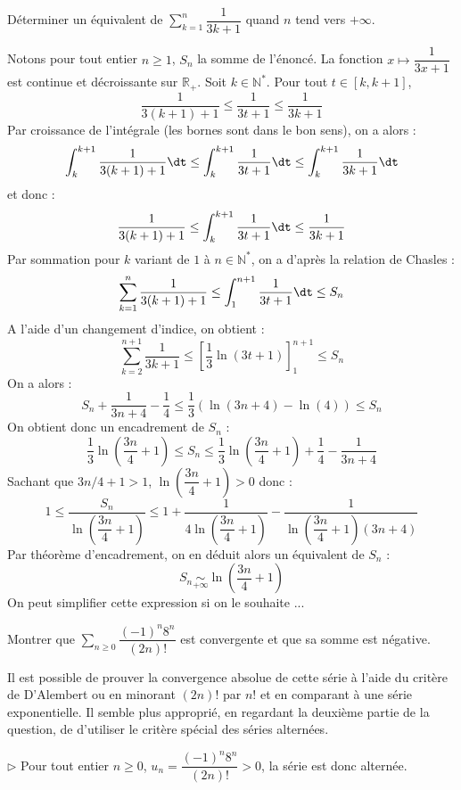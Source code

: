 \documentclass[a4paper,10pt]{report}
\newcommand{\Sum}[2]{\ensuremath{\textstyle{\sum\limits_{#1}^{#2}}}}
\begin{document}
\begin{Exa} Déterminer un équivalent de $\Sum{k=1}n \dfrac{1}{3k+1}$ quand $n$ tend vers $+ \infty$.
\end{Exa}

\corr Notons pour tout entier $n \geq 1$, $S_n$ la somme de l'énoncé. La fonction $x \mapsto \dfrac{1}{3x+1}$ est continue et décroissante sur $\mathbb{R}_+$. Soit $k \in \mathbb{N}^*$. Pour tout $t \in [k,k+1]$,
$$ \dfrac{1}{3(k+1)+1} \leq \dfrac{1}{3t+1} \leq \dfrac{1}{3k+1}$$
Par croissance de l'intégrale (les bornes sont dans le bon sens), on a alors :
$$ \int_{k}^{k+1} \dfrac{1}{3(k+1)+1} \dt \leq  \int_{k}^{k+1} \dfrac{1}{3t+1} \dt \leq  \int_{k}^{k+1} \dfrac{1}{3k+1} \dt$$
et donc :
$$  \dfrac{1}{3(k+1)+1}  \leq  \int_{k}^{k+1} \dfrac{1}{3t+1} \dt  \leq  \dfrac{1}{3k+1} $$
Par sommation pour $k$ variant de $1$ à $n \in \mathbb{N}^*$, on a d'après la relation de Chasles :
$$ \sum_{k=1}^n \dfrac{1}{3(k+1)+1}  \leq  \int_{1}^{n+1} \dfrac{1}{3t+1} \dt  \leq S_n $$
A l'aide d'un changement d'indice, on obtient :
$$ \sum_{k=2}^{n+1} \dfrac{1}{3k+1}  \leq  \left[ \dfrac{1}{3} \ln(3t+1) \right]_1^{n+1}  \leq S_n $$
On a alors :
$$ S_n + \dfrac{1}{3n+4} - \dfrac{1}{4} \leq \dfrac{1}{3} ( \ln(3n+4)- \ln(4)) \leq S_n $$
On obtient donc un encadrement de $S_n$ :
$$ \dfrac{1}{3} \ln \left( \dfrac{3n}{4} + 1 \right) \leq S_n \leq \dfrac{1}{3} \ln \left( \dfrac{3n}{4} + 1 \right) + \dfrac{1}{4} - \dfrac{1}{3n+4}$$
Sachant que $3n/4+1>1$, $\ln \left( \dfrac{3n}{4} + 1 \right)>0$ donc :
$$ 1 \leq \dfrac{S_n}{\ln \left( \dfrac{3n}{4} + 1 \right)} \leq 1 + \dfrac{1}{4\ln \left( \dfrac{3n}{4} + 1 \right)} - \dfrac{1}{\ln \left( \dfrac{3n}{4} + 1 \right)(3n+4)}$$
Par théorème d'encadrement, on en déduit alors un équivalent de $S_n$ :
$$ S_n \underset{+ \infty}{\sim} \ln \left( \dfrac{3n}{4} + 1 \right)$$
On peut simplifier cette expression si on le souhaite ...

\begin{Exa} Montrer que $\Sum{n \geq 0}{} {\dfrac{( - 1)^n 8^n}{(2n)!}}$ est convergente et que sa somme est négative. \end{Exa}

\corr Il est possible de prouver la convergence absolue de cette série à l'aide du critère de D'Alembert ou en minorant $(2n)!$ par $n!$ et en comparant à une série exponentielle. Il semble plus approprié, en regardant la deuxième partie de la question, de d'utiliser le critère spécial des séries alternées.

\medskip

\noindent $\rhd$ Pour tout entier $n \geq 0$, $u_n = \dfrac{( - 1)^n 8^n}{(2n)!} > 0$, la série est donc alternée. 
\end{document}
